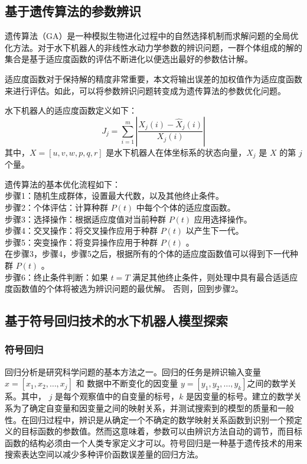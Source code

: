 \subsection{基于遗传算法的参数辨识  }

遗传算法（GA）是一种模拟生物进化过程中的自然选择机制而求解问题的全局优化方法。对于水下机器人的非线性水动力学参数的辨识问题，一群个体组成的解的集合是基于适应度函数的评估不断进化以便选出最好的参数估计解\cite{yuan2010genetic,zhou2013genetic,chang2007nonlinear}。

适应度函数对于保持解的精度非常重要，本文将输出误差的加权值作为适应度函数来进行评估。如此，可以将参数辨识问题转变成为遗传算法的参数优化问题。

水下机器人的适应度函数定义如下：
\begin{equation}
\label{eq:chap3:11}
{J_j} = \sum\limits_{i = 1}^m {\left| {\frac{{{X_j}(i) - {{\hat X}_j}(i)}}{{{X_j}\left( i \right)}}} \right|}
\end{equation}
其中，$X=[u,v,w,p,q,r]$ 是水下机器人在体坐标系的状态向量，$X_j$ 是 $X$ 的第 $j$ 个量。

遗传算法的基本优化流程如下：\\
步骤1：随机生成群体，设置最大代数，以及其他终止条件。\\
步骤2：个体评估：计算种群 $P(t)$ 中每个个体的适应度函数。\\
步骤3：选择操作：根据适应度值对当前种群 $P(t)$ 应用选择操作。\\
步骤4：交叉操作：将交叉操作应用于种群 $P(t)$ 以产生下一代。\\
步骤5：突变操作：将变异操作应用于种群 $P(t)$ 。\\
在步骤3，步骤4，步骤5之后，根据所有的个体的适应度函数值可以得到下一代种群 $P(t)$ 。\\
步骤6：终止条件判断：如果 $t = T$ 满足其他终止条件，则处理中具有最合适适应度函数值的个体将被选为辨识问题的最优解。 否则，回到步骤2。\\

\subsection{基于符号回归技术的水下机器人模型探索  }

\subsubsection{符号回归 }

回归分析是研究科学问题的基本方法之一。回归的任务是辨识输入变量 $x = [x_1, x_2,\ldots,x_j]$ 和 数据中不断变化的因变量 $y = [y_1, y_2, \ldots,y_k]$之间的数学关系。其中， $j$ 是每个观察值中的自变量的标号，$k$ 是因变量的标号。建立的数学关系为了确定自变量和因变量之间的映射关系，并测试搜索到的模型的质量和一般性。在回归过程中，辨识是从确定一个不确定的数学映射关系函数到识别一个预定义的目标函数的参数值。然而这意味着，参数可以由辨识方法自动的调节，而目标函数的结构必须由一个人类专家定义才可以。符号回归是一种基于遗传技术的用来搜索表达空间以减少多种评价函数误差量的回归方法\cite{schmidt2009distilling}。

